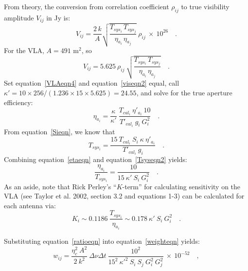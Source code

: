\documentclass[11pt]{article}
\begin{document}
From theory, the conversion from correlation coefficient $\rho_{ij}$ to
true visibility amplitude $V_{ij}$ in Jy is:
\begin{equation}
\label{viseqn}
   V_{ij} = \frac{2 \, k}{A}
          \sqrt{\frac{T_{sys_i} \, T_{sys_j}}{\eta_{a_i} \, \eta_{a_j}}}
            \ \rho_{ij} \ \times \ 10^{26}
   \quad .
\end{equation}
For the VLA, $A = 491$ m$^2$, so
\begin{equation}
\label{viseqn2}
   V_{ij} = 5.625 \ \rho_{ij} \
          \sqrt{\frac{T_{sys_i} \, T_{sys_j}}{\eta_{a_i} \, \eta_{a_j}}}
   \quad .
\end{equation}
Set equation~\ref{VLAeqn4} and equation~\ref{viseqn2} equal, call
$\kappa' = 10 \times 256 / (1.236 \times 15 \times 5.625) = 24.55$,
and solve for the true aperture efficiency:
\begin{equation}
\label{etaeqn}
   \eta_{a_i} = \frac{\kappa}{\kappa'} \
                \frac{T_{cal_i} \ \eta'_{a_i} \ 10}
                     {T'_{cal_i} \ g_i \ G_i^2}
   \quad .
\end{equation}
From equation~\ref{Sieqn}, we know that
\begin{equation}
\label{Tsyseqn2}
   T_{sys_i} = \frac{15 \ T_{cal_i} \ S_i \ \kappa \ \eta'_{a_i}}
                    {T'_{cal_i} \ g_i}
   \quad .
\end{equation}
Combining equation~\ref{etaeqn} and equation~\ref{Tsyseqn2} yields:
\begin{equation}
   \label{ratioeqn}
   \frac{\eta_{a_i}}{T_{sys_i}} =
      \frac{10}{15 \ \kappa' \ S_i \ G_i^2} \quad .
\end{equation}
As an aside, note that Rick Perley's ``$K$-term'' for calculating
sensitivity on the VLA (see Taylor et al. 2002, section 3.2 and
equations 1-3) can be calculated for each antenna via:
\begin{equation}
   K_i \sim 0.1186 \ \frac{T_{sys_i}}{\eta_{a_i}}
       \sim 0.178 \ \kappa' \ S_i \ G_i^2
   \quad .
\end{equation}

Substituting equation~\ref{ratioeqn} into equation~\ref{weighteqn}
yields:
\begin{equation}
   w_{ij} = \frac{\eta_c^2 \ A^2}{2 \ k^2} \ \Delta\nu \Delta{t} \
            \frac{10^2}
                 {15^2 \ \kappa'^2 \ S_i \ S_j \ G_i^2 \ G_j^2} \
            \times \ 10^{-52} \quad ,
\end{equation}
\end{document}

